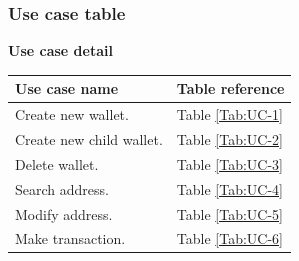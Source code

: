 \newpage
\subsubsection{Use case table}

\bigskip
{\textbf{Use case detail}}

\begin{table}[b]
    \begin{tabular}{ m{8cm} m{6cm}}
        \toprule
        Use case name            & Table reference      \\ 
        \midrule
        Create new wallet.       & Table \ref{Tab:UC-1} \\ 
        Create new child wallet. & Table \ref{Tab:UC-2} \\ 
        Delete wallet.           & Table \ref{Tab:UC-3} \\ 
        Search address.          & Table \ref{Tab:UC-4} \\ 
        Modify address.          & Table \ref{Tab:UC-5} \\ 
        Make transaction.        & Table \ref{Tab:UC-6} \\ 
        \bottomrule
    \end{tabular}
\end{table}
\clearpage

